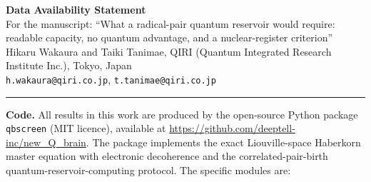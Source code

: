 \documentclass[11pt,a4paper]{article}
\begin{document}
\begin{center}
{\Large\bfseries Data Availability Statement}\\[0.6em]
{\small For the manuscript: ``What a radical-pair quantum reservoir would require:
readable capacity, no quantum advantage, and a nuclear-register criterion''}\\[0.3em]
{\small Hikaru Wakaura and Taiki Tanimae, QIRI (Quantum Integrated Research Institute Inc.), Tokyo, Japan}\\[0.3em]
{\small \texttt{h.wakaura@qiri.co.jp}, \texttt{t.tanimae@qiri.co.jp}}
\end{center}

\vspace{0.8em}
\hrule
\vspace{1em}

\noindent\textbf{Code.}
All results in this work are produced by the open-source Python package
\texttt{qbscreen} (MIT licence), available at
\url{https://github.com/deeptell-inc/new_Q_brain}. The package
implements the exact Liouville-space Haberkorn master equation with electronic
decoherence and the correlated-pair-birth quantum-reservoir-computing protocol. The
specific modules are:
\end{document}
